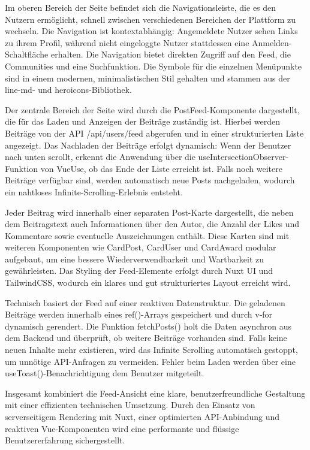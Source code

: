 \documentclass[a4paper,12pt]{article}
\begin{document}
Im oberen Bereich der Seite befindet sich die Navigationsleiste, die es den
Nutzern ermöglicht, schnell zwischen verschiedenen Bereichen der Plattform zu
wechseln. Die Navigation ist kontextabhängig: Angemeldete Nutzer sehen Links zu
ihrem Profil, während nicht eingeloggte Nutzer stattdessen eine
Anmelden-Schaltfläche erhalten. Die Navigation bietet direkten Zugriff auf den
Feed, die Communities und eine Suchfunktion. Die Symbole für die einzelnen
Menüpunkte sind in einem modernen, minimalistischen Stil gehalten und stammen
aus der line-md- und heroicons-Bibliothek.

Der zentrale Bereich der Seite wird durch die PostFeed-Komponente dargestellt,
die für das Laden und Anzeigen der Beiträge zuständig ist. Hierbei werden
Beiträge von der API /api/users/feed abgerufen und in einer strukturierten
Liste angezeigt. Das Nachladen der Beiträge erfolgt dynamisch: Wenn der
Benutzer nach unten scrollt, erkennt die Anwendung über die
useIntersectionObserver-Funktion von VueUse, ob das Ende der Liste erreicht
ist. Falls noch weitere Beiträge verfügbar sind, werden automatisch neue Posts
nachgeladen, wodurch ein nahtloses Infinite-Scrolling-Erlebnis entsteht.

Jeder Beitrag wird innerhalb einer separaten Post-Karte dargestellt, die neben
dem Beitragstext auch Informationen über den Autor, die Anzahl der Likes und
Kommentare sowie eventuelle Auszeichnungen enthält. Diese Karten sind mit
weiteren Komponenten wie CardPost, CardUser und CardAward modular aufgebaut, um
eine bessere Wiederverwendbarkeit und Wartbarkeit zu gewährleisten. Das Styling
der Feed-Elemente erfolgt durch Nuxt UI und TailwindCSS, wodurch ein klares und
gut strukturiertes Layout erreicht wird.

Technisch basiert der Feed auf einer reaktiven Datenstruktur. Die geladenen
Beiträge werden innerhalb eines ref()-Arrays gespeichert und durch v-for
dynamisch gerendert. Die Funktion fetchPosts() holt die Daten asynchron aus dem
Backend und überprüft, ob weitere Beiträge vorhanden sind. Falls keine neuen
Inhalte mehr existieren, wird das Infinite Scrolling automatisch gestoppt, um
unnötige API-Anfragen zu vermeiden. Fehler beim Laden werden über eine
useToast()-Benachrichtigung dem Benutzer mitgeteilt.

Insgesamt kombiniert die Feed-Ansicht eine klare, benutzerfreundliche
Gestaltung mit einer effizienten technischen Umsetzung. Durch den Einsatz von
serverseitigem Rendering mit Nuxt, einer optimierten API-Anbindung und
reaktiven Vue-Komponenten wird eine performante und flüssige Benutzererfahrung
sichergestellt.
\end{document}
